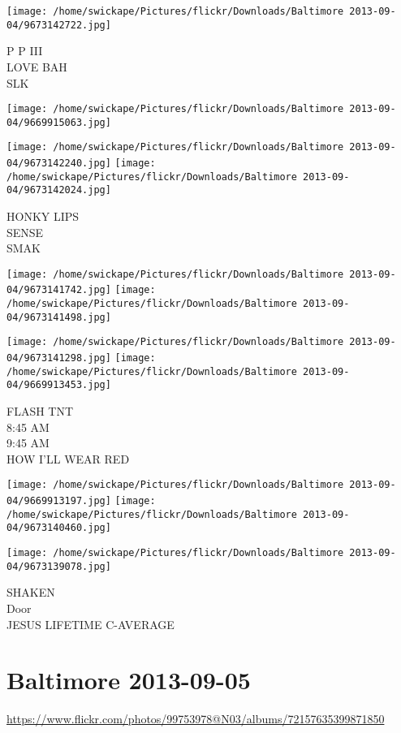 \documentclass[10pt,letterpaper]{article}
\begin{document}
\texttt{[image: /home/swickape/Pictures/flickr/Downloads/Baltimore 2013-09-04/9673142722.jpg]}

P P III\\
LOVE BAH\\
SLK
\pagebreak

\texttt{[image: /home/swickape/Pictures/flickr/Downloads/Baltimore 2013-09-04/9669915063.jpg]}

\vspace{0.25in}
\texttt{[image: /home/swickape/Pictures/flickr/Downloads/Baltimore 2013-09-04/9673142240.jpg]}
\texttt{[image: /home/swickape/Pictures/flickr/Downloads/Baltimore 2013-09-04/9673142024.jpg]}

HONKY LIPS\\
SENSE\\
SMAK
\pagebreak

\texttt{[image: /home/swickape/Pictures/flickr/Downloads/Baltimore 2013-09-04/9673141742.jpg]}
\texttt{[image: /home/swickape/Pictures/flickr/Downloads/Baltimore 2013-09-04/9673141498.jpg]}

\texttt{[image: /home/swickape/Pictures/flickr/Downloads/Baltimore 2013-09-04/9673141298.jpg]}
\texttt{[image: /home/swickape/Pictures/flickr/Downloads/Baltimore 2013-09-04/9669913453.jpg]}

FLASH TNT\\
8:45 AM\\
9:45 AM\\
HOW I'LL WEAR RED
\pagebreak

\texttt{[image: /home/swickape/Pictures/flickr/Downloads/Baltimore 2013-09-04/9669913197.jpg]}
\texttt{[image: /home/swickape/Pictures/flickr/Downloads/Baltimore 2013-09-04/9673140460.jpg]}

\texttt{[image: /home/swickape/Pictures/flickr/Downloads/Baltimore 2013-09-04/9673139078.jpg]}

SHAKEN\\
Door\\
JESUS LIFETIME C{-}AVERAGE
\pagebreak

\section*{Baltimore 2013-09-05}

\url{https://www.flickr.com/photos/99753978@N03/albums/72157635399871850}
\end{document}
